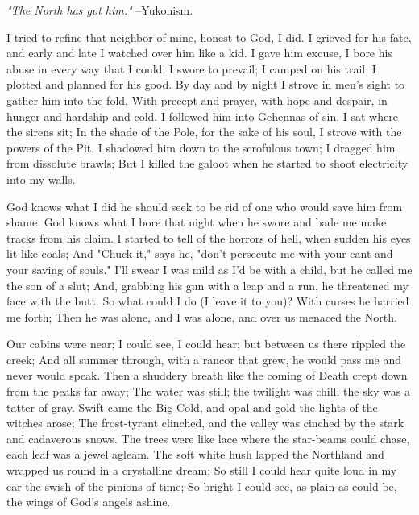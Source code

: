 
\begin{poemblock}
\textit{"The North has got him."} --Yukonism.


 I tried to refine that neighbor of mine, honest to God, I did.
 I grieved for his fate, and early and late I watched over him like a kid.
 I gave him excuse, I bore his abuse in every way that I could;
 I swore to prevail; I camped on his trail;
   I plotted and planned for his good.
 By day and by night I strove in men's sight to gather him into the fold,
 With precept and prayer, with hope and despair,
   in hunger and hardship and cold.
 I followed him into Gehennas of sin, I sat where the sirens sit;
 In the shade of the Pole, for the sake of his soul,
   I strove with the powers of the Pit.
 I shadowed him down to the scrofulous town;
   I dragged him from dissolute brawls;
 But I killed the galoot when he started to shoot electricity into my walls.

 God knows what I did he should seek to be rid
   of one who would save him from shame.
 God knows what I bore that night when he swore
   and bade me make tracks from his claim.
 I started to tell of the horrors of hell,
   when sudden his eyes lit like coals;
 And "Chuck it," says he, "don't persecute me
   with your cant and your saving of souls."
 I'll swear I was mild as I'd be with a child,
   but he called me the son of a slut;
 And, grabbing his gun with a leap and a run,
   he threatened my face with the butt.
 So what could I do (I leave it to you)?  With curses he harried me forth;
 Then he was alone, and I was alone, and over us menaced the North.

 Our cabins were near; I could see, I could hear;
   but between us there rippled the creek;
 And all summer through, with a rancor that grew,
   he would pass me and never would speak.
 Then a shuddery breath like the coming of Death
   crept down from the peaks far away;
 The water was still; the twilight was chill; the sky was a tatter of gray.
 Swift came the Big Cold, and opal and gold the lights of the witches arose;
 The frost-tyrant clinched, and the valley was cinched
   by the stark and cadaverous snows.
 The trees were like lace where the star-beams could chase,
   each leaf was a jewel agleam.
 The soft white hush lapped the Northland and wrapped
   us round in a crystalline dream;
 So still I could hear quite loud in my ear
   the swish of the pinions of time;
 So bright I could see, as plain as could be,
   the wings of God's angels ashine.


\end{poemblock}
